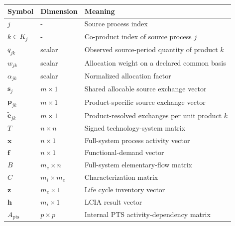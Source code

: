 \documentclass[
  10pt,
  a4paper,
  DIV=11,
  numbers=noendperiod]{scrartcl}
\newcounter{none} %
\begin{document}
{\def\LTcaptype{none} %
\begin{longtable}[]{@{}
  >{\raggedright\arraybackslash}p{}
  >{\raggedleft\arraybackslash}p{}
  >{\raggedright\arraybackslash}p{}@{}}
\toprule\noalign{}
\begin{minipage}[b]{\linewidth}\raggedright
Symbol
\end{minipage} & \begin{minipage}[b]{\linewidth}\raggedleft
Dimension
\end{minipage} & \begin{minipage}[b]{\linewidth}\raggedright
Meaning
\end{minipage} \\
\midrule\noalign{}
\endhead
\bottomrule\noalign{}
\endlastfoot
\(j\) & - & Source process index \\
\(k\in K_j\) & - & Co-product index of source process \(j\) \\
\(q_{jk}\) & scalar & Observed source-period quantity of product
\(k\) \\
\(w_{jk}\) & scalar & Allocation weight on a declared common basis \\
\(\alpha_{jk}\) & scalar & Normalized allocation factor \\
\(\mathbf s_j\) & \(m\times1\) & Shared allocable source exchange
vector \\
\(\mathbf p_{jk}\) & \(m\times1\) & Product-specific source exchange
vector \\
\(\widetilde{\mathbf e}_{jk}\) & \(m\times1\) & Product-resolved
exchanges per unit product \(k\) \\
\(T\) & \(n\times n\) & Signed technology-system matrix \\
\(\mathbf x\) & \(n\times1\) & Full-system process activity vector \\
\(\mathbf f\) & \(n\times1\) & Functional-demand vector \\
\(B\) & \(m_e\times n\) & Full-system elementary-flow matrix \\
\(C\) & \(m_i\times m_e\) & Characterization matrix \\
\(\mathbf z\) & \(m_e\times1\) & Life cycle inventory vector \\
\(\mathbf h\) & \(m_i\times1\) & LCIA result vector \\
\(A_{\mathrm{pts}}\) & \(p\times p\) & Internal PTS activity-dependency
matrix \\

\end{longtable}}
\end{document}
